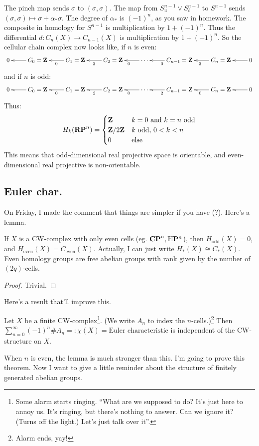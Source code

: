 The pinch map sends $\sigma$ to $(\sigma,\sigma)$. The map from $S^{n-1}_u\vee S^{n-1}_\ell$ to $S^{n-1}$ sends $(\sigma,\sigma)\mapsto \sigma+\alpha_\ast\sigma$. The degree of $\alpha_\ast$ is $(-1)^n$, as you saw in homework. The composite in homology for $S^{n-1}$ is multiplication by $1+(-1)^n$. Thus the differential $d:C_n(X)\to C_{n-1}(X)$ is multiplication by $1+(-1)^n$. So the cellular chain complex now looks like, if $n$ is even:
\begin{equation*}
\xymatrix{0 & C_0=\Z\ar[l] & C_1=\Z\ar[l]^0 & C_2=\Z \ar[l]^2 & \cdots\ar[l]^0 & C_{n-1}=\Z\ar[l]^0 & C_n=\Z\ar[l]^2 & 0\ar[l]}
\end{equation*}
and if $n$ is odd:
\begin{equation*}
\xymatrix{0 & C_0=\Z\ar[l] & C_1=\Z\ar[l]^0 & C_2=\Z \ar[l]^2 & \cdots\ar[l]^0 & C_{n-1}=\Z\ar[l]^2 & C_n=\Z\ar[l]^0 & 0\ar[l]}
\end{equation*}
Thus:
\begin{equation*}
 H_k(\mathbf{RP}^n)=\begin{cases}
\mathbf Z & k=0\text{ and }k=n\text{ odd}\\
\mathbf Z/2\mathbf Z & k\text{ odd, }0<k<n\\
0 & \text{else}
\end{cases}
\end{equation*}
This means that odd-dimensional real projective space is orientable, and even-dimensional real projective is non-orientable.
\subsection{Euler char.}
On Friday, I made the comment that things are simpler if you have (?). Here's a lemma.
\begin{lemma}
If $X$ is a CW-complex with only even cells (eg. $\mathbf{CP}^n,\mathbb{H}\mathbf{P}^n$), then $ H_\text{odd}(X)=0$, and $ H_\text{even}(X)=C_\text{even}(X)$. Actually, I can just write $ H_\ast(X)\cong C_\ast(X)$. Even homology groups are free abelian groups with rank given by the number of $(2q)$-cells.
\end{lemma}
\begin{proof}
Trivial.
\end{proof}
Here's a result that'll improve this.
\begin{theorem}
Let $X$ be a finite CW-complex\footnote{Some alarm starts ringing. ``What are we supposed to do? It's just here to annoy us. It's ringing, but there's nothing to answer. Can we ignore it? (Turns off the light.) Let's just talk over it''.}. (We write $A_n$ to index the $n$-cells.)\footnote{Alarm ends, yay!} Then $\sum^\infty_{n=0}(-1)^n\# A_n=:\chi(X)=\text{Euler characteristic}$ is independent of the CW-structure on $X$. 
\end{theorem}
When $n$ is even, the lemma is much stronger than this. I'm going to prove this theorem. Now I want to give a little reminder about the structure of finitely generated abelian groups.
